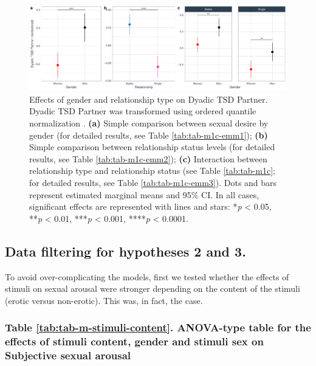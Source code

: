 \documentclass[
  bookmarksnumbered]{article}
\begin{document}
\begin{figure}
\centering
\includegraphics{Sexual_Desire_Arousal_anonymous_files/figure-latex/fig-h1c-1.pdf}
\caption{\label{fig:fig-h1c}Effects of gender and relationship type on Dyadic TSD Partner. Dyadic TSD Partner was transformed using ordered quantile normalization \autocite{petersonOrderedQuantileNormalization2020a}. \textbf{(a)} Simple comparison between sexual desire by gender (for detailed results, see Table \ref{tab:tab-m1c-emm1}); \textbf{(b)} Simple comparison between relationship status levels (for detailed results, see Table \ref{tab:tab-m1c-emm2}); \textbf{(c)} Interaction between relationship type and relationship status (see Table \ref{tab:tab-m1c}; for detailed results, see Table \ref{tab:tab-m1c-emm3}). Dots and bars represent estimated marginal means and 95\% CI. In all cases, significant effects are represented with lines and stars: *\emph{p} \textless{} 0.05, **\emph{p} \textless{} 0.01, ***\emph{p} \textless{} 0.001, ****\emph{p} \textless{} 0.0001.}
\end{figure}

\subsection{Data filtering for hypotheses 2 and 3.}\label{datfil2and3}

To avoid over-complicating the models, first we tested whether the effects of stimuli on sexual arousal were stronger depending on the content of the stimuli (erotic versus non-erotic). This was, in fact, the case.

\subsubsection{Table \ref{tab:tab-m-stimuli-content}. ANOVA-type table for the effects of stimuli content, gender and stimuli sex on Subjective sexual arousal}\label{table-reftabtab-m-stimuli-content.-anova-type-table-for-the-effects-of-stimuli-content-gender-and-stimuli-sex-on-subjective-sexual-arousal}
\end{document}
